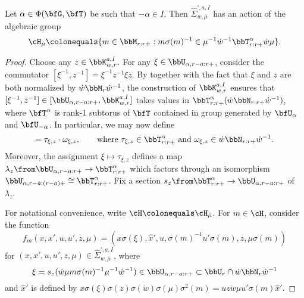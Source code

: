 \begin{lemma}\label{lem:w mu action}
  Let $\alpha \in \Phi(\bfG,\bfT)$ be such that $-\alpha \in I$. Then
  $\widehat \Sigma_{w,\bar \mu}^{\prime, a, I}$ has an action of the algebraic group
  \begin{equation*}
    \cH_{\bar \mu} \colonequals \{m \in \bbM_{r:r+} : m \sigma(m)^{-1} \in \mu^{-1} \dot w^{-1} \bbT_{r:r+}^\alpha \dot w \mu\}.
  \end{equation*}
\end{lemma}

\begin{proof}
  Choose any $z \in \bbK_{w,r}^{a,I}$. For any $\xi \in \bbU_{\alpha,r-a:r+}$, consider the commutator $[\xi^{-1},z^{-1}] = \xi^{-1} z^{-1} \xi z$. By \cite[Proposition 3.8]{CI21-RT} together with the fact that $\xi$ and $z$ are both normalized by $\dot w \bbM_r \dot w^{-1}$, the construction of $\bbK_{w,r}^{a,I}$ ensures that $[\xi^{-1},z^{-1}] \in [\bbU_{\alpha,r-a:r+},\bbK_{w,r}^{a,I}]$ takes values in $\bbT_{r:r+}^\alpha(\dot w \bbN_{r:r+} \dot w^{-1})$, where $\bfT^\alpha$ is rank-1 subtorus of $\bfT$ contained in group generated by $\bfU_\alpha$ and $\bfU_{-\alpha}$. In particular, we may now define 
  \begin{equation*}
    [\xi^{-1},z^{-1}] = \tau_{\xi,z} \cdot \omega_{\xi,z}, \qquad \text{where $\tau_{\xi,z} \in \bbT_{r:r+}^\alpha$ and $\omega_{\xi,z} \in \dot w \bbN_{r:r+} \dot w^{-1}$.}
  \end{equation*} 
  Moreover, the assignment $\xi \mapsto \tau_{\xi,z}$ defines a map $\lambda_z \from \bbU_{\alpha,r-a:r+} \to \bbT_{r:r+}^\alpha$ which factors through an isomorphism $\bbU_{\alpha,r-a:(r-a)+} \cong \bbT_{r:r+}^\alpha$. Fix a section $s_z \from \bbT_{r:r+}^\alpha \to \bbU_{\alpha,r-a:r+}$ of $\lambda_z$.

  For notational convenience, write $\cH \colonequals \cH_{\bar \mu}$. For $m \in \cH$, consider the function
  \begin{equation}\label{eq:m action}
    f_{m}(x,x',u,u',z,\mu) = (x \sigma(\xi), \hat x', u, \sigma(m)^{-1}u'\sigma(m), z, \mu \sigma(m))
  \end{equation}
  for $(x,x',u,u',z,\mu) \in \widehat \Sigma_{w,\bar \mu}^{\prime,a,I}$, where
  \begin{equation*}
    \xi = s_z(\dot w \mu m \sigma(m)^{-1} \mu^{-1} \dot w^{-1}) \in \bbU_{\alpha,r-a:r+} \subset \bbU_r \cap \dot w \bbN_r \dot w^{-1}
  \end{equation*}
  and $\hat x'$ is defined by 
  $x \sigma(\xi) \sigma(z) \sigma(\dot w) \sigma(\mu) \sigma^2(m) = u z \dot w \mu u' \sigma(m) \hat x'$.   
  

\end{proof}
